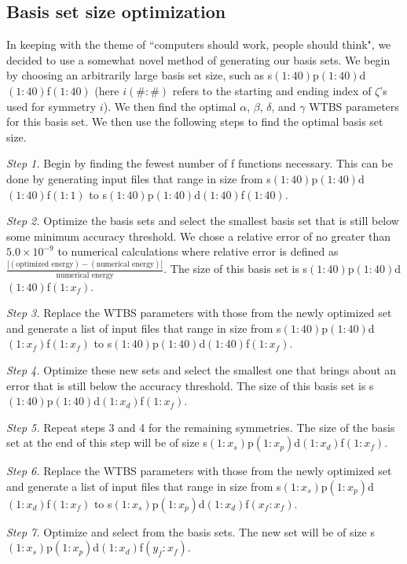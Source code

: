\documentclass[12pt]{report}
\begin{document}
\subsection{Basis set size optimization}
In keeping with the theme of ``computers should work, people should think", we decided to use a somewhat novel method of generating our basis sets. We begin by choosing an arbitrarily large basis set size, such as s$(1:40)$p$(1:40)$d$(1:40)$f$(1:40)$ (here $i(\#:\#)$ refers to the starting and ending index of $\zeta$'s used for symmetry $i$). We then find the optimal $\alpha$, $\beta$, $\delta$, and $\gamma$ WTBS parameters for this basis set. We then use the following steps to find the optimal basis set size.

\textit{Step 1.} Begin by finding the fewest number of f functions necessary. This can be done by generating input files that range in size from s$(1:40)$p$(1:40)$d$(1:40)$f$(1:1)$ to s$(1:40)$p$(1:40)$d$(1:40)$f$(1:40)$.

\textit{Step 2.} Optimize the basis sets and select the smallest basis set that is still below some minimum accuracy threshold. We chose a relative error of no greater than $5.0\times10^{-9}$ to numerical calculations where relative error is defined as $\frac{|(\text{optimized energy}) - (\text{numerical energy})|}{\text{numerical energy}}$. The size of this basis set is s$(1:40)$p$(1:40)$d$(1:40)$f$(1:x_{f})$.

\textit{Step 3.} Replace the WTBS parameters with those from the newly optimized set and generate a list of input files that range in size from s$(1:40)$p$(1:40)$d$(1:x_{f})$f$(1:x_{f})$ to s$(1:40)$p$(1:40)$d$(1:40)$f$(1:x_{f})$.

\textit{Step 4.} Optimize these new sets and select the smallest one that brings about an error that is still below the accuracy threshold. The size of this basis set is s$(1:40)$p$(1:40)$d$(1:x_{d})$f$(1:x_{f})$.

\textit{Step 5.} Repeat steps 3 and 4 for the remaining symmetries. The size of the basis set at the end of this step will be of size s$(1:x_{s})$p$(1:x_{p})$d$(1:x_{d})$f$(1:x_{f})$.

\textit{Step 6.} Replace the WTBS parameters with those from the newly optimized set and generate a list of input files that range in size from s$(1:x_{s})$p$(1:x_{p})$d$(1:x_{d})$f$(1:x_{f})$ to s$(1:x_{s})$p$(1:x_{p})$d$(1:x_{d})$f$(x_{f}:x_{f})$.

\textit{Step 7.} Optimize and select from the basis sets. The new set will be of size s$(1:x_{s})$p$(1:x_{p})$d$(1:x_{d})$f$(y_{f}:x_{f})$.
\end{document}

